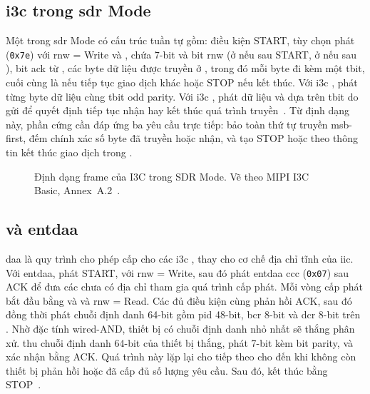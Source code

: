 \subsection{\texorpdfstring{\gls{i3c}}{I3C} \PrivateWriteRead{} trong \texorpdfstring{\gls{sdr}}{SDR} Mode}
\label{sec:bg-frame}

Một \PrivateTransfer{} trong \gls{sdr} Mode có cấu trúc tuần tự gồm: điều kiện START, tùy chọn phát \IThreeCBroadcastAddress{} (\texttt{0x7e}) với \gls{rnw} = Write và \RepeatedSTART{}, \AddressHeader{} chứa \DynamicAddress{} 7-bit và bit \gls{rnw} (ở \OpenDrain{} nếu sau START, ở \PushPull{} nếu sau \RepeatedSTART{}), bit \gls{ack} từ \Target{}, các byte dữ liệu được truyền ở \PushPull{}, trong đó mỗi byte đi kèm một \gls{tbit}, cuối cùng là \RepeatedSTART{} nếu tiếp tục giao dịch khác hoặc STOP nếu kết thúc. Với \gls{i3c} \PrivateWrite{}, \Controller{} phát từng byte dữ liệu cùng \gls{tbit} odd parity. Với \gls{i3c} \PrivateRead{}, \Target{} phát dữ liệu và \Controller{} dựa trên \gls{tbit} do \Target{} gửi để quyết định tiếp tục nhận hay kết thúc quá trình truyền~\cite{mipi_i3c_basic}. Từ định dạng này, phần cứng cần đáp ứng ba yêu cầu trực tiếp: bảo toàn thứ tự truyền \gls{msb}-first, đếm chính xác số byte đã truyền hoặc nhận, và tạo STOP hoặc \RepeatedSTART{} theo thông tin kết thúc giao dịch trong \CommandDescriptor{}.

\begin{figure}[!htbp]
	\centering
	
	\caption[Định dạng frame I3C Private Write/Read]{Định dạng frame của I3C \PrivateWriteRead{} trong SDR Mode. Vẽ theo MIPI I3C Basic, Annex~A.2~\cite{mipi_i3c_basic}.}
	\label{fig:sdr-frame}
\end{figure}

\subsection{\DynamicAddressAssignment{} và \texorpdfstring{\gls{entdaa}}{ENTDAA}}
\label{sec:bg-daa}

\acrfull{daa} là quy trình cho phép \Controller{} cấp \DynamicAddress{} cho các \gls{i3c} \Target{}, thay cho cơ chế địa chỉ tĩnh của \gls{iic}. Với \gls{entdaa}, \Controller{} phát START, \IThreeCBroadcastAddress{} với \gls{rnw} = Write, sau đó phát \gls{entdaa} \gls{ccc} (\texttt{0x07}) sau ACK để đưa các \Target{} chưa có địa chỉ tham gia quá trình cấp phát. Mỗi vòng cấp phát bắt đầu bằng \RepeatedSTART{} và \IThreeCBroadcastAddress{} và \gls{rnw} = Read. Các \Target{} đủ điều kiện cùng phản hồi ACK, sau đó đồng thời phát chuỗi định danh 64-bit gồm \gls{pid} 48-bit, \gls{bcr} 8-bit và \gls{dcr} 8-bit trên \OpenDrain{}. Nhờ đặc tính wired-AND, thiết bị có chuỗi định danh nhỏ nhất sẽ thắng phân xử. \Controller{} thu chuỗi định danh 64-bit của thiết bị thắng, phát \DynamicAddress{} 7-bit kèm bit parity, và \Target{} xác nhận bằng ACK. Quá trình này lặp lại cho \Target{} tiếp theo cho đến khi không còn thiết bị phản hồi \IThreeCBroadcastAddress{} hoặc đã cấp đủ số lượng yêu cầu. Sau đó, \Controller{} kết thúc bằng STOP~\cite{mipi_i3c_basic}.

